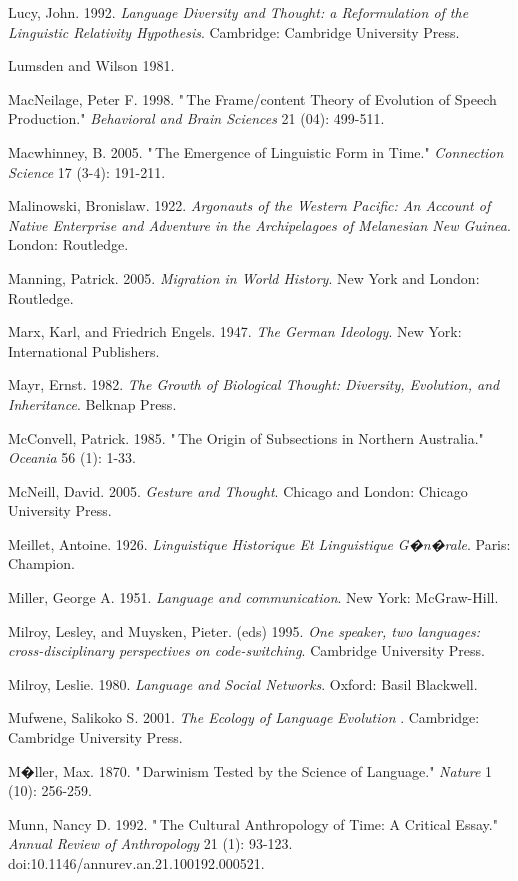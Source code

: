 Lucy, John. 1992. \textit{Language Diversity and Thought: a 
Reformulation of the Linguistic Relativity Hypothesis}. Cambridge: 
Cambridge University Press.

Lumsden and Wilson 1981.

MacNeilage, Peter F. 1998. "\,The Frame/content Theory of Evolution of 
Speech Production." \textit{Behavioral and Brain Sciences} 21 (04): 
499-511.

Macwhinney, B. 2005. "\,The Emergence of Linguistic Form in Time." 
\textit{Connection Science} 17 (3-4): 191-211.

Malinowski, Bronislaw. 1922. \textit{Argonauts of the Western Pacific: 
An Account of Native Enterprise and Adventure in the Archipelagoes of 
Melanesian New Guinea}. London: Routledge.

Manning, Patrick. 2005. \textit{Migration in World History}. New York 
and London: Routledge.

Marx, Karl, and Friedrich Engels. 1947. \textit{The German Ideology}. 
New York: International Publishers.

Mayr, Ernst. 1982. \textit{The Growth of Biological Thought: Diversity, 
Evolution, and Inheritance}. Belknap Press.

McConvell, Patrick. 1985. "\,The Origin of Subsections in Northern 
Australia." \textit{Oceania} 56 (1): 1-33.

McNeill, David. 2005. \textit{Gesture and Thought}. Chicago and 
London: Chicago University Press.

Meillet, Antoine. 1926. \textit{Linguistique Historique Et Linguistique 
G�n�rale}. Paris: Champion.

Miller, George A. 1951. \textit{Language and communication}. New 
York: McGraw-Hill.

Milroy, Lesley, and Muysken, Pieter. (eds) 1995. \textit{One speaker, 
two languages: cross-disciplinary perspectives on code-switching}. 
Cambridge University Press.

Milroy, Leslie. 1980. \textit{Language and Social Networks}. Oxford: 
Basil Blackwell.

Mufwene, Salikoko S. 2001. \textit{The Ecology of Language Evolution}
. Cambridge: Cambridge University Press.

M�ller, Max. 1870. "\,Darwinism Tested by the Science of Language." 
\textit{Nature} 1 (10): 256-259.

Munn, Nancy D. 1992. "\,The Cultural Anthropology of Time: A Critical 
Essay." \textit{Annual Review of Anthropology} 21 (1): 93-123. 
doi:10.1146/annurev.an.21.100192.000521.

